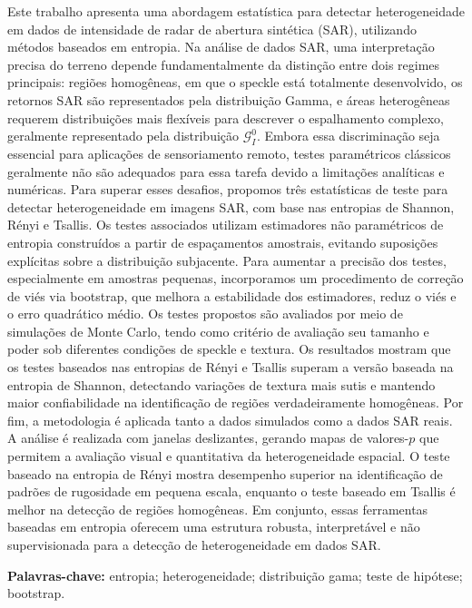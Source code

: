 Este trabalho apresenta uma abordagem estatística para detectar heterogeneidade em dados de
intensidade de radar de abertura sintética (SAR), utilizando métodos baseados em entropia.
Na análise de dados SAR, uma interpretação precisa do terreno depende fundamentalmente da
distinção entre dois regimes principais: regiões homogêneas, em que o speckle está
totalmente desenvolvido, os retornos SAR são representados pela distribuição Gamma, e áreas heterogêneas requerem distribuições mais flexíveis para descrever
o espalhamento complexo, geralmente representado pela distribuição
$\mathcal{G}_I^0$.
Embora essa discriminação seja essencial para aplicações de sensoriamento remoto, 
testes paramétricos clássicos geralmente não são adequados para essa tarefa devido a 
limitações analíticas e numéricas.
Para superar esses desafios, propomos três estatísticas de teste para detectar heterogeneidade
em imagens SAR, com base nas entropias de Shannon, Rényi e Tsallis. Os testes associados utilizam
estimadores não paramétricos de entropia construídos a partir de espaçamentos amostrais,
evitando suposições explícitas sobre a distribuição subjacente. Para aumentar a precisão dos testes,
especialmente em amostras pequenas, incorporamos um procedimento de correção de viés via bootstrap,
que melhora a estabilidade dos estimadores, reduz o viés e o erro quadrático médio.
Os testes propostos são avaliados por meio de simulações de Monte Carlo,
tendo como critério de avaliação seu tamanho e poder sob diferentes condições de speckle e textura.
Os resultados mostram que os testes baseados nas entropias de Rényi e Tsallis superam a versão baseada
na entropia de Shannon, detectando variações de textura mais sutis e mantendo maior confiabilidade na
identificação de regiões verdadeiramente homogêneas.
Por fim, a metodologia é aplicada tanto a dados simulados como a dados SAR reais.
A análise é realizada com janelas deslizantes, gerando mapas de valores-$p$ que permitem a
avaliação visual e quantitativa da heterogeneidade espacial. O teste baseado na entropia de
Rényi mostra desempenho superior na identificação de padrões de rugosidade em pequena escala,
enquanto o teste baseado em Tsallis é melhor na detecção de regiões homogêneas. Em conjunto,
essas ferramentas baseadas em entropia oferecem uma estrutura robusta, interpretável e não
supervisionada para a detecção de heterogeneidade em dados SAR.

\vspace{1em}
\par
\noindent \textbf{Palavras-chave:} entropia;  heterogeneidade; distribuição gama; teste de hipótese; bootstrap.